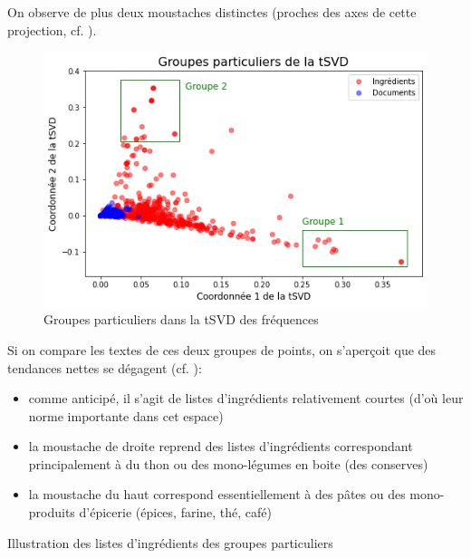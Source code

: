             On observe de plus deux \og moustaches \fg distinctes (proches des axes de cette projection, cf. ).
            \begin{figure}[htbp]
                \begin{center}
                \includegraphics[width=0.9\linewidth]{img/tSVD_freq_groups.png}
                \end{center}
                \caption{Groupes particuliers dans la tSVD des fréquences}
                \label{fig:tSVD_freq_groups}
            \end{figure}    
            Si on compare les textes de ces deux groupes de points, on s'aperçoit que des tendances nettes se dégagent (cf. ):
            \begin{itemize}
                \item comme anticipé, il s'agit de listes d'ingrédients relativement courtes (d'où leur norme importante dans cet espace)
                \item la moustache de droite reprend des listes d'ingrédients correspondant principalement à du thon ou des mono-légumes en boite (des conserves)
                \item la moustache du haut correspond essentiellement à des pâtes ou des mono-produits d'épicerie (épices, farine, thé, café)        
            \end{itemize}           
            {\renewcommand{\arraystretch}{1.5}%
            \begin{table}[htbp]
                \begin{center}
                {\scriptsize
                
                }
                \caption{Illustration des listes d'ingrédients des groupes particuliers}
                \label{tbl:tSVD_sample}
                \end{center}
            \end{table}
            }

            